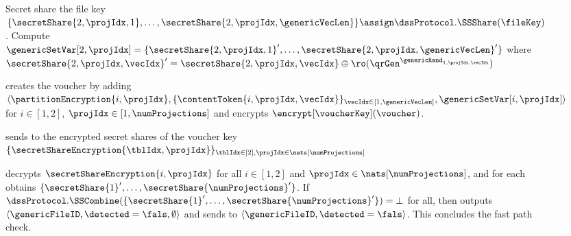 \begin{figure}
{\begin{minipage}[t]{\textwidth}
\item Secret share the file key $\{ \secretShare{2, \projIdx, 1}, \dots, \secretShare{2, \projIdx, \genericVecLen} \} \assign \dssProtocol.\SSShare(\fileKey)$. Compute $\genericSetVar[2, \projIdx] = \{ \secretShare{2, \projIdx, 1}', \dots, \secretShare{2, \projIdx, \genericVecLen}' \} $ where $\secretShare{2, \projIdx, \vecIdx}' = \secretShare{2, \projIdx, \vecIdx} \oplus \ro(\qrGen^{\genericRand_{1, \projIdx, \vecIdx}})$ 




\enumListEnd

\item \label{fuzzy:pre:voucher} \client creates the voucher \voucher  by adding $\langle \partitionEncryption{i, \projIdx}, \{\contentToken{i, \projIdx, \vecIdx}\}_{\vecIdx \in [1, \genericVecLen]} ,\genericSetVar[i, \projIdx] \rangle$ for $i \in [1,2]$, $\projIdx \in [1, \numProjections]$ and encrypts $\encrypt[\voucherKey](\voucher)$. 

\item {} \client sends to \server the encrypted secret shares of the voucher key $\{\secretShareEncryption{\tblIdx,\projIdx}\}_{\tblIdx \in [2], \projIdx \in \nats[\numProjections]}$


\item  \server decrypts $\secretShareEncryption{i, \projIdx}$ for all $i \in [1,2]$ and $\projIdx \in \nats[\numProjections]$, and for each obtains $\{ \secretShare{1}', \dots, \secretShare{\numProjections}'\}$. If $\dssProtocol.\SSCombine(\{ \secretShare{1}', \dots, \secretShare{\numProjections}'\}) = \bot$ for all, then \server outputs $\langle \genericFileID, \detected = \fals, \emptyset \rangle$ and sends to \client $\langle \genericFileID, \detected=\fals\rangle$. This concludes the fast path check. 


\end{minipage}}
\end{figure}
